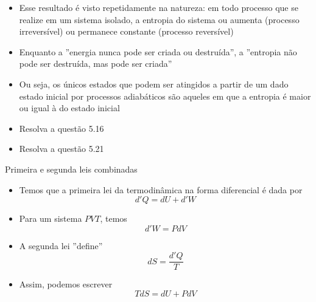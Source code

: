 \documentclass[t,%
brazilian,%
11pt,%
aspectratio=169,%
table%
]{beamer}
\begin{document}
\begin{frame}
    \begin{itemize}
        \item Esse resultado é visto repetidamente na natureza: em todo processo
            que se realize em um sistema isolado, a entropia do sistema ou aumenta 
            (processo irreversível) ou permanece constante (processo reversível)
        \item Enquanto a ''energia nunca pode ser criada ou destruída'', a ''entropia não
            pode ser destruída, mas pode ser criada''
        \item Ou seja, os únicos estados que podem ser atingidos a partir de um dado
            estado inicial por processos adiabáticos são aqueles em que a entropia é
            maior ou igual à do estado inicial
        \item Resolva a questão 5.16
        \item Resolva a questão 5.21
    \end{itemize}
\end{frame}

\begin{frame}{Primeira e segunda leis combinadas}
    \begin{itemize}
        \item Temos que a primeira lei da termodinâmica na forma diferencial é dada por
            \[
                d'Q=dU+d'W
            \]
        \item Para um sistema \(PVT\), temos
            \[
                d'W=PdV
            \]
        \item A segunda lei ''define''
            \[
                dS = \frac{d'Q}{T}
            \]
        \item Assim, podemos escrever
            \[
                TdS=dU + PdV
            \]

    \end{itemize}
\end{frame}
\end{document}
